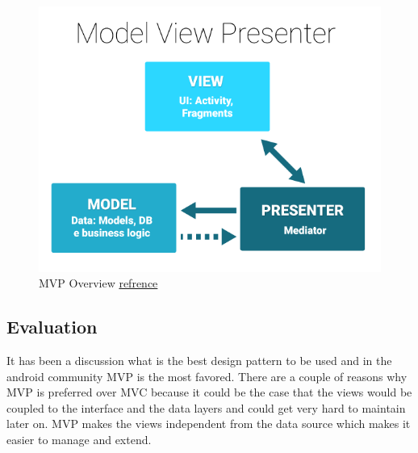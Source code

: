         \begin{figure}[htbp!]
            \centering \includegraphics[scale=0.5]{grafiken/mvp.jpg}
            \caption{MVP Overview 
            \href{https://cms-assets.tutsplus.com/uploads/users/1308/posts/26206/image/MVP-Android.png}{refrence}}
            \label{fig:mvpOverview}
        \end{figure}

    \subsection{Evaluation}
        It has been a discussion what is the best design pattern to be used and in the 
        android community MVP is the most favored. There are a couple of reasons why 
        MVP is preferred over MVC because it could be the case that the views would be
        coupled to the interface and the data layers and could get very hard to maintain
        later on. MVP makes the views independent from the data source which makes it
        easier to manage and extend.


